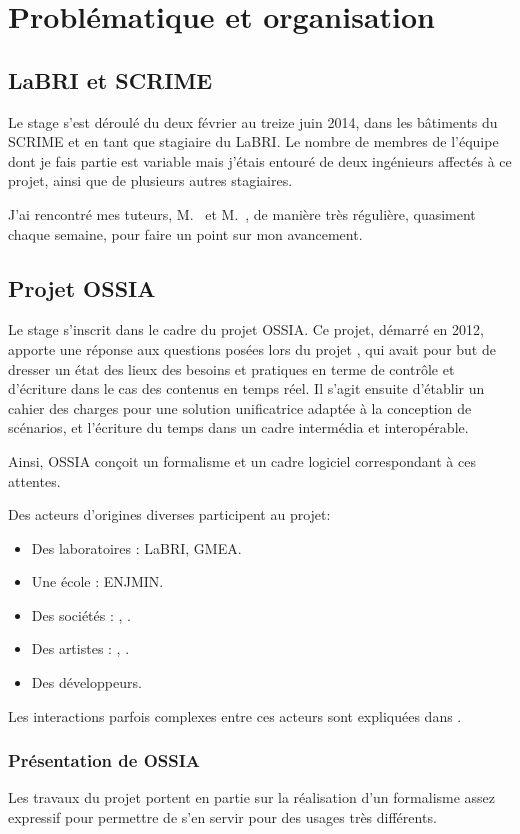 \chapter{Problématique et organisation}
\section{LaBRI et SCRIME}
Le stage s'est déroulé du deux février au treize juin 2014, dans les bâtiments du \ac{SCRIME} et en tant que stagiaire du \ac{LaBRI}. Le nombre de membres de l'équipe dont je fais partie est variable mais j'étais entouré de deux ingénieurs affectés à ce projet, ainsi que de plusieurs autres stagiaires.

J'ai rencontré mes tuteurs, M.~ et M.~, de manière très régulière, quasiment chaque semaine, pour faire un point sur mon avancement.

\section{Projet OSSIA}
Le stage s'inscrit dans le cadre du projet  \ac{OSSIA}. Ce projet, démarré en 2012, apporte une réponse aux questions posées lors du projet , qui avait pour but de dresser un état des lieux des besoins et pratiques en terme de contrôle et d'écriture dans le cas des contenus en temps réel. Il s'agit ensuite d'établir un cahier des charges pour une solution unificatrice adaptée à la conception de scénarios, et l'écriture du temps dans un cadre intermédia et interopérable.

Ainsi, \ac{OSSIA} conçoit un formalisme et un cadre logiciel correspondant à ces attentes.

Des acteurs d'origines diverses participent au projet:
\begin{itemize}
	\item Des laboratoires : \ac{LaBRI}, \ac{GMEA}.
	\item Une école : \ac{ENJMIN}.
	\item Des sociétés : , .
	\item Des artistes : , .
	\item Des développeurs.
\end{itemize}

Les interactions parfois complexes entre ces acteurs sont expliquées dans \cite{meyssonnier2013analyse}.

\subsection{Présentation de OSSIA}
\label{section.presOssia}
Les travaux du projet portent en partie sur la réalisation d'un formalisme assez expressif pour permettre de s'en servir pour des usages très différents.


